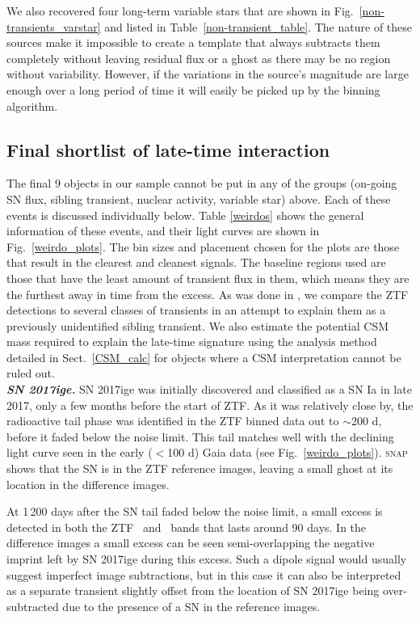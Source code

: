 \documentclass[a4paper,oneside,12pt, class=Latex/Classes/PhDthesisPSnPDF, crop=false]{standalone}
\begin{document}
We also recovered four long-term variable stars that are shown in Fig.~\ref{non-transients_varstar} and listed in Table~\ref{non-transient_table}. The nature of these sources make it impossible to create a template that always subtracts them completely without leaving residual flux or a ghost as there may be no region without variability. However, if the variations in the source's magnitude are large enough over a long period of time it will easily be picked up by the binning algorithm.


\subsection{Final shortlist of late-time interaction}
\label{weirdo_section}
The final 9 objects in our sample cannot be put in any of the groups (on-going SN flux, sibling transient, nuclear activity, variable star) above. Each of these events is discussed individually below. Table \ref{weirdos} shows the general information of these events, and their light curves are shown in Fig.~\ref{weirdo_plots}. The bin sizes and placement chosen for the plots are those that result in the clearest and cleanest signals. The baseline regions used are those that have the least amount of transient flux in them, which means they are the furthest away in time from the excess. As was done in \citet{Terwel_2024_paper1}, we compare the ZTF detections to several classes of transients in an attempt to explain them as a previously unidentified sibling transient. We also estimate the potential CSM mass required to explain the late-time signature using the analysis method detailed in Sect.~\ref{CSM_calc} for objects where a CSM interpretation cannot be ruled out.\\


\textit{\textbf{SN 2017ige.}}
SN 2017ige was initially discovered and classified as a SN Ia in late 2017, only a few months before the start of ZTF. As it was relatively close by, the radioactive tail phase was identified in the ZTF binned data out to $\sim$200 d, before it faded below the noise limit. This tail matches well with the declining light curve seen in the early ($<$100 d) Gaia data (see Fig.~\ref{weirdo_plots}). \textsc{snap} shows that the SN is in the ZTF reference images, leaving a small ghost at its location in the difference images. 

At 1\,200 days after the SN tail faded below the noise limit, a small excess is detected in both the ZTF \ztfg~and \ztfr~bands that lasts around 90 days. In the difference images a small excess can be seen semi-overlapping the negative imprint left by SN 2017ige during this excess. Such a dipole signal would usually suggest imperfect image subtractions, but in this case it can also be interpreted as a separate transient slightly offset from the location of SN 2017ige being over-subtracted due to the presence of a SN in the reference images.
\end{document}
